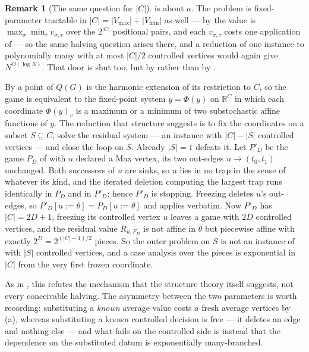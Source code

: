 \documentclass[11pt]{article}
\theoremstyle{plain}
\theoremstyle{definition}
\newtheorem{remark}[theorem]{Remark}
\newcommand{\Vmax}{V_{\max}}
\newcommand{\Vmin}{V_{\min}}
\begin{document}
\begin{remark}[The same question for $|C|$]\label{rem:no-halving-controlled}
 is about $a$. The problem is fixed-parameter tractable in
$|C|=|\Vmax|+|\Vmin|$ as well --- by  the value is
$\max_\sigma\min_\tau v_{\sigma,\tau}$ over the $2^{|C|}$ positional pairs, and
each $v_{\sigma,\tau}$ costs one application of  --- so
the same halving question arises there, and a reduction of one instance to
polynomially many with at most $|C|/2$ controlled vertices would again give
$N^{O(\log N)}$. That door is shut too, but by  rather than by
.

By  a point of $Q(G)$ is the harmonic extension of its
restriction to $C$, so the game is equivalent to the fixed-point system
$y=\Phi(y)$ on $\mathbb{R}^{C}$ in which each coordinate $\Phi(y)_v$ is a
maximum or a minimum of two substochastic affine functions of $y$. The reduction
that structure suggests is to fix the coordinates on a subset $S\subseteq C$,
solve the residual system --- an instance with $|C|-|S|$ controlled vertices ---
and close the loop on $S$. Already $|S|=1$ defeats it. Let $P'_D$ be the game
$P_D$ of  with $u$ declared a Max vertex, its two out-edges
$u\to(t_0,t_1)$ unchanged. Both successors of $u$ are sinks, so $u$ lies in no
trap in the sense of  whatever its kind, and the iterated
deletion computing the largest trap runs identically in $P_D$ and in $P'_D$;
hence $P'_D$ is stopping. Freezing deletes $u$'s out-edges, so
$P'_D[u{:=}\theta]=P_D[u{:=}\theta]$ and  applies verbatim. Now
$P'_D$ has $|C|=2D+1$, freezing its controlled vertex $u$ leaves a game with
$2D$ controlled vertices, and the residual value $R_{u,F_D}$ is not affine in
$\theta$ but piecewise affine with exactly $2^{D}=2^{(|C|-1)/2}$ pieces. So the
outer problem on $S$ is not an instance of  with $|S|$
controlled vertices, and a case analysis over the pieces is exponential in
$|C|$ from the very first frozen coordinate.

As in , this refutes the mechanism that the structure
theory itself suggests, not every conceivable halving. The asymmetry between the
two parameters is worth recording: substituting a \emph{known} average value
costs $a$ fresh average vertices by (a), whereas
substituting a known controlled decision is free --- it deletes an edge and
nothing else --- and what fails on the controlled side is instead that the
dependence on the substituted datum is exponentially many-branched.
\end{remark}
\end{document}
